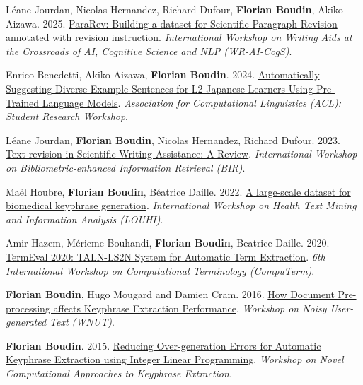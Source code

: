 \item
Léane Jourdan, Nicolas Hernandez, Richard Dufour, \textbf{Florian Boudin}, Akiko Aizawa.
2025.
\href{https://aclanthology.org/2025.wraicogs-1.4.pdf}{ParaRev: Building a dataset for Scientific Paragraph Revision annotated with revision instruction}.
\textit{International Workshop on Writing Aids at the Crossroads of AI, Cognitive Science and NLP (WR-AI-CogS)}.
\label{jourdan-etal-2025-pararev}

\item 
Enrico Benedetti, Akiko Aizawa, \textbf{Florian Boudin}.
2024.
\href{https://aclanthology.org/2024.acl-srw.11.pdf}{Automatically Suggesting Diverse Example Sentences for L2 Japanese Learners Using Pre-Trained Language Models}.
\textit{Association for Computational Linguistics (ACL): Student Research Workshop}.
\label{benedetti-etal-2024-automatically}

\item 
Léane Jourdan, \textbf{Florian Boudin}, Nicolas Hernandez, Richard Dufour.
2023.
\href{https://ceur-ws.org/Vol-3617/paper-04.pdf}{Text revision in Scientific Writing Assistance: A Review}.
\textit{International Workshop on Bibliometric-enhanced Information Retrieval (BIR)}.
\label{jourdan-etal-2023-text}

\item 
Maël Houbre, \textbf{Florian Boudin}, Béatrice Daille.
2022.
\href{https://aclanthology.org/2022.louhi-1.6.pdf}{A large-scale dataset for biomedical keyphrase generation}.
\textit{International Workshop on Health Text Mining and Information Analysis (LOUHI)}.
\label{houbre-etal-2022-large}

\item 
Amir Hazem, Mérieme Bouhandi, \textbf{Florian Boudin}, Beatrice Daille.
2020.
\href{https://aclanthology.org/2020.computerm-1.13.pdf}{TermEval 2020: TALN-LS2N System for Automatic Term Extraction}.
\textit{6th International Workshop on Computational Terminology (CompuTerm)}.
\label{hazem-etal-2020-termeval}

\item 
\textbf{Florian Boudin}, Hugo Mougard and Damien Cram.
2016.
\href{https://aclanthology.org/W16-3917.pdf}{How Document Pre-processing affects Keyphrase Extraction Performance}.
\textit{Workshop on Noisy User-generated Text (WNUT)}.
\label{boudin-etal-2016-document}

\item 
\textbf{Florian Boudin}.
2015.
\href{https://aclanthology.org/W15-3605.pdf}{Reducing Over-generation Errors for Automatic Keyphrase Extraction using Integer Linear Programming}.
\textit{Workshop on Novel Computational Approaches to Keyphrase Extraction}.
\label{boudin-2015-reducing}

